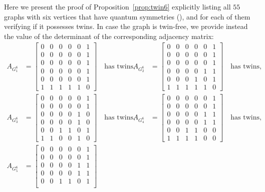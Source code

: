 \documentclass[11pt,reqno]{amsart}
\begin{document}
Here we present the proof of Proposition~\ref{prop:twin6} explicitly listing all $55$ graphs with six vertices that have quantum symmetries (\cite{Weber22}), and for each of them verifying if it possesses twins. In case the graph is twin-free, we provide instead the value of the determinant of the corresponding adjacency matrix:
\allowdisplaybreaks
\begin{align*}
A_{\scriptscriptstyle G_{1}^6}&=\begin{bmatrix}
0&0&0&0&0&1\\
0&0&0&0&0&1\\
0&0&0&0&0&1\\
0&0&0&0&0&1\\
0&0&0&0&0&1\\
1&1&1&1&1&0
\end{bmatrix}\quad\text{has twins},
&A_{\scriptscriptstyle G_{2}^6}&=\begin{bmatrix}
0&0&0&0&0&1\\
0&0&0&0&0&1\\
0&0&0&0&0&1\\
0&0&0&0&1&1\\
0&0&0&1&0&1\\
1&1&1&1&1&0
\end{bmatrix}\quad\text{has twins},
\\
A_{\scriptscriptstyle G_{3}^6}&=\begin{bmatrix}
0&0&0&0&0&1\\
0&0&0&0&0&1\\
0&0&0&0&1&0\\
0&0&0&0&1&0\\
0&0&1&1&0&1\\
1&1&0&0&1&0
\end{bmatrix}\quad\text{has twins},
&A_{\scriptscriptstyle G_{4}^6}&=\begin{bmatrix}
0&0&0&0&0&1\\
0&0&0&0&0&1\\
0&0&0&0&1&1\\
0&0&0&0&1&1\\
0&0&1&1&0&0\\
1&1&1&1&0&0
\end{bmatrix}\quad\text{has twins},
\\
A_{\scriptscriptstyle G_{5}^6}&=\begin{bmatrix}
0&0&0&0&0&1\\
0&0&0&0&0&1\\
0&0&0&0&1&1\\
0&0&0&0&1&1\\
0&0&1&1&0&1\\

\end{bmatrix}
\end{align*}
\end{document}
